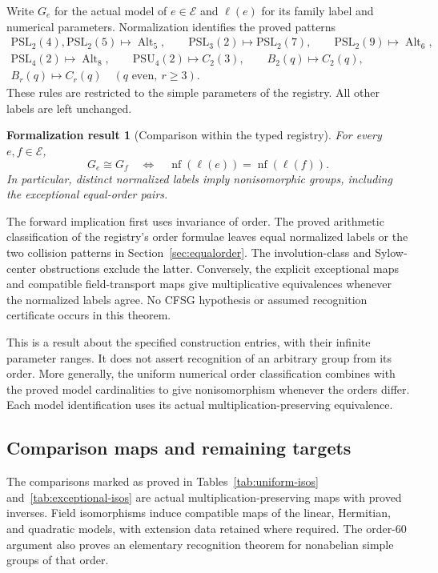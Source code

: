 \documentclass[11pt]{article}
\numberwithin{equation}{section}
\newtheorem{formalization}[theorem]{Formalization result}
\theoremstyle{definition}
\newcommand{\PSL}{\mathrm{PSL}}
\newcommand{\PSU}{\mathrm{PSU}}
\newcommand{\Alt}{\operatorname{Alt}}
\begin{document}
Write $G_e$ for the actual model of $e\in\mathcal E$ and $\ell(e)$
for its family label and numerical parameters. Normalization identifies
the proved patterns
\[
\begin{gathered}
 \PSL_2(4),\PSL_2(5)\longmapsto\Alt_5,\qquad
 \PSL_3(2)\longmapsto\PSL_2(7),\qquad
 \PSL_2(9)\longmapsto\Alt_6,\\
 \PSL_4(2)\longmapsto\Alt_8,\qquad
 \PSU_4(2)\longmapsto C_2(3),\qquad
 B_2(q)\longmapsto C_2(q),\\
 B_r(q)\longmapsto C_r(q)\quad(q\text{ even},\ r\geq3).
\end{gathered}
\]
These rules are restricted to the simple parameters of the registry.
All other labels are left unchanged.

\begin{formalization}[Comparison within the typed registry]
\label{thm:catalogue-comparison}
For every $e,f\in\mathcal E$,
\[
 G_e\cong G_f
 \quad\Longleftrightarrow\quad
 \operatorname{nf}(\ell(e))=\operatorname{nf}(\ell(f)).
\]
In particular, distinct normalized labels imply nonisomorphic groups,
including the exceptional equal-order pairs.
\end{formalization}

The forward implication first uses invariance of order. The proved
arithmetic classification of the registry's order formulae leaves equal
normalized labels or the two collision patterns in
Section~\ref{sec:equalorder}. The involution-class and Sylow-center
obstructions exclude the latter. Conversely, the explicit exceptional
maps and compatible field-transport maps give multiplicative equivalences
whenever the normalized labels agree. No CFSG hypothesis or assumed
recognition certificate occurs in this theorem.

This is a result about the specified construction entries, with their
infinite parameter ranges. It does not assert recognition of an arbitrary
group from its order. More generally, the uniform numerical order
classification combines with the proved model cardinalities to give
nonisomorphism whenever the orders differ. Each model identification
uses its actual multiplication-preserving equivalence.

\subsection{Comparison maps and remaining targets}

The comparisons marked as proved in Tables~\ref{tab:uniform-isos}
and~\ref{tab:exceptional-isos} are actual multiplication-preserving maps
with proved inverses. Field isomorphisms induce compatible maps of the
linear, Hermitian, and quadratic models, with extension data retained
where required. The order-$60$ argument also proves an elementary
recognition theorem for nonabelian simple groups of that order.
\end{document}
